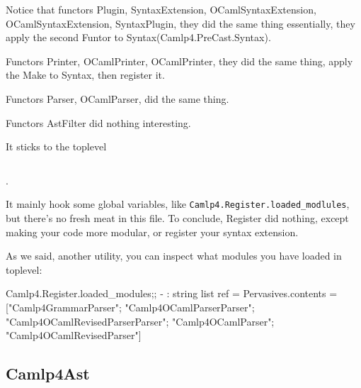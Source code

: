 Notice that functors Plugin, SyntaxExtension, OCamlSyntaxExtension,
OCamlSyntaxExtension, SyntaxPlugin, they did the same thing
essentially, they apply the second Funtor to Syntax(Camlp4.PreCast.Syntax).

Functors Printer, OCamlPrinter, OCamlPrinter, they did the same thing,
apply the Make to Syntax, then register it. 

Functors Parser, OCamlParser, did the same thing. 

Functors AstFilter  did nothing interesting.

It sticks to the toplevel 

\inputminted[fontsize=\scriptsize,
             firstline=123,
             lastline=126,
            ]{ocaml}{camlp4/code/Register.ml}.

It mainly hook some global variables, like
\verb|Camlp4.Register.loaded_modlules|, but there's no fresh meat in
this file.
To conclude, Register did nothing, except making your code more
modular, or register your syntax extension.

As we said, another utility, you can inspect what modules you have
loaded in toplevel:
\begin{ocamlcode}
Camlp4.Register.loaded_modules;;
- : string list ref =
{Pervasives.contents =
  ["Camlp4GrammarParser"; "Camlp4OCamlParserParser";
   "Camlp4OCamlRevisedParserParser"; "Camlp4OCamlParser";
   "Camlp4OCamlRevisedParser"]}
\end{ocamlcode}


\subsection{Camlp4Ast}
\inputminted[fontsize=\scriptsize,
            ]{ocaml}{camlp4/code/ast/ast_def.ml}





